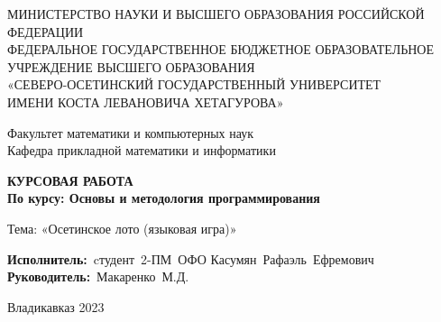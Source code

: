 \documentclass[14pt, a4paper]{extarticle}
\begin{document}
\onehalfspacing   
\setmonofont{Times New Roman}
\setmainfont{Times New Roman} 
\newfontfamily{}
\newfontfamily{}
\begin{titlepage}
\newpage
\begin{center}
\small{МИНИСТЕРСТВО НАУКИ И ВЫСШЕГО ОБРАЗОВАНИЯ РОССИЙСКОЙ ФЕДЕРАЦИИ \\
     ФЕДЕРАЛЬНОЕ ГОСУДАРСТВЕННОЕ БЮДЖЕТНОЕ ОБРАЗОВАТЕЛЬНОЕ \\
     УЧРЕЖДЕНИЕ ВЫСШЕГО ОБРАЗОВАНИЯ \\
     «СЕВЕРО-ОСЕТИНСКИЙ ГОСУДАРСТВЕННЫЙ УНИВЕРСИТЕТ \\
     ИМЕНИ КОСТА ЛЕВАНОВИЧА ХЕТАГУРОВА» \\}
\end{center}
\vspace {2em}
\begin{center}
\small{Факультет математики и компьютерных наук \\
     Кафедра прикладной математики и информатики \\
     }
\end{center}
\vspace{2em}
\begin{center}
\textbf{КУРСОВАЯ РАБОТА} \\ 
\vspace{2em}
\textbf{По курсу: Основы и методология программирования} \\
\end{center}
\vspace{1.1em}
\begin{center}
Тема: «Осетинское лото (языковая игра)»
\end{center}
\vspace{3em}
\begin{flushright}
      \vbox{%
\hfill%
\vbox{%
\hbox{\textbf{Исполнитель:} cтудент 2-ПМ ОФО}%
\hbox{Касумян Рафаэль Ефремович}%
\hbox{\textbf{Руководитель:} Макаренко М.Д.}
}%
} 
\end{flushright}
\vspace{8em}
\begin{center}
Владикавказ 2023 \\
\end{center}
\end{titlepage}
\setcounter{page}{1} %
\newpage 
\begin{center}
    \tableofcontents
\end{center}
\newpage
\setcounter{subsection}{0}
\setcounter{equation}{0}
\setcounter{section}{0}
\end{document}
